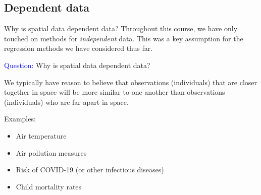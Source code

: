 \documentclass[10pt,t]{beamer}
\begin{document}
\subsection{Dependent data}

\begin{frame}{Why is spatial data dependent data?}
Throughout this course, we have only touched on methods for \textit{independent} data. This was a key assumption for the regression methods we have considered thus far.

\vspace{0.3cm}

\textcolor{blue}{Question:} Why is spatial data dependent data?

\vspace{0.3cm}

\pause We typically have reason to believe that observations (individuals) that are closer together in space will be more similar to one another than observations (individuals) who are far apart in space.

\vspace{0.3cm}

\pause Examples:

\vspace{0.3cm}

\begin{itemize}
	\item Air temperature
	\item Air pollution measures
	\item Risk of COVID-19 (or other infectious diseases)
	\item Child mortality rates
\end{itemize} 

\end{frame}
\end{document}
